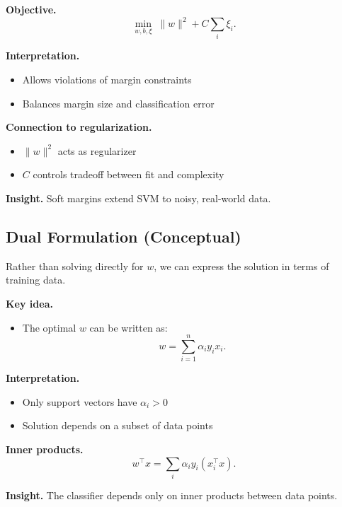 \noindent
\textbf{Objective.}
\[
\min_{w,b,\xi} \; \|w\|^2 + C \sum_i \xi_i.
\]

\medskip

\noindent
\textbf{Interpretation.}
\begin{itemize}
    \item Allows violations of margin constraints
    \item Balances margin size and classification error
\end{itemize}

\medskip

\noindent
\textbf{Connection to regularization.}
\begin{itemize}
    \item $\|w\|^2$ acts as regularizer
    \item $C$ controls tradeoff between fit and complexity
\end{itemize}

\medskip

\noindent
\textbf{Insight.}  
Soft margins extend SVM to noisy, real-world data.

\subsection{Dual Formulation (Conceptual)}

Rather than solving directly for $w$, we can express the solution in terms of training data.

\medskip

\noindent
\textbf{Key idea.}
\begin{itemize}
    \item The optimal $w$ can be written as:
    \[
    w = \sum_{i=1}^n \alpha_i y_i x_i.
    \]
\end{itemize}

\medskip

\noindent
\textbf{Interpretation.}
\begin{itemize}
    \item Only support vectors have $\alpha_i > 0$
    \item Solution depends on a subset of data points
\end{itemize}

\medskip

\noindent
\textbf{Inner products.}
\[
w^\top x = \sum_i \alpha_i y_i (x_i^\top x).
\]

\medskip

\noindent
\textbf{Insight.}  
The classifier depends only on inner products between data points.

